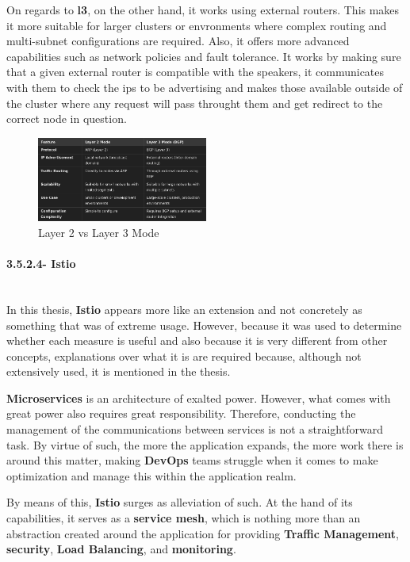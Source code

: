 On regards to \textbf{l3}, on the other hand, it works using external routers. This makes it more suitable for larger clusters or envronments where complex routing and multi-subnet configurations are required. Also, it offers more advanced capabilities such as network policies and fault tolerance. It works by making sure that a given external router is compatible with the speakers, it communicates with them to check the ips to be advertising and makes those available outside of the cluster where any request will pass throught them and get redirect to the correct node in question.

\begin{figure}[H]
    \centering
    \includegraphics[width=0.5\textwidth]{assets/tools/metallb/bgp-vs-l2.png} %
    \caption{Layer 2 vs Layer 3 Mode}
    \label{fig:sample-image} 
\end{figure}

\paragraph{3.5.2.4- Istio}\mbox{}\\
In this thesis, \textbf{Istio} appears more like an extension and not concretely as something that was of extreme usage. However, because it was used to determine whether each measure is useful and also because it is very different from other concepts, explanations over what it is are required because, although not extensively used, it is mentioned in the thesis.

\textbf{Microservices} is an architecture of exalted power. However, what comes with great power also requires great responsibility. Therefore, conducting the management of the communications between services is not a straightforward task. By virtue of such, the more the application expands, the more work there is around this matter, making \textbf{DevOps} teams struggle when it comes to make optimization and manage this within the application realm.

By means of this, \textbf{Istio} surges as alleviation of such. At the hand of its capabilities, it serves as a \textbf{service mesh}, which is nothing more than an abstraction created around the application for providing \textbf{Traffic Management}, \textbf{security}, \textbf{Load Balancing}, and \textbf{monitoring}.

